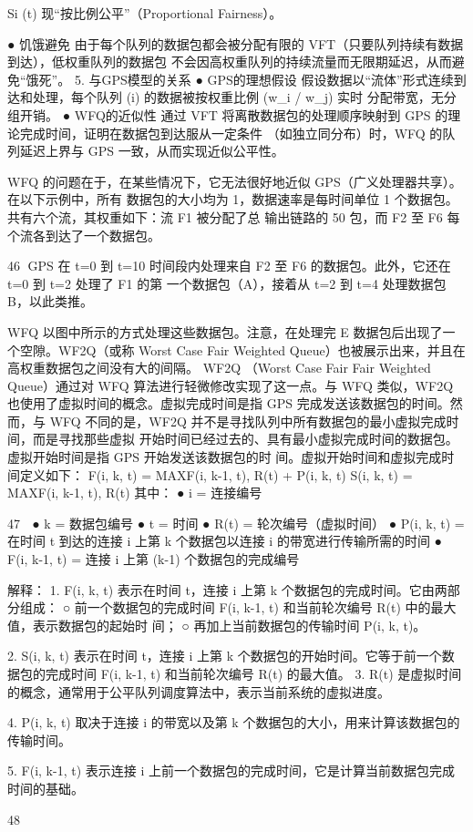           Si (t)
   现“按比例公平”（Proportional Fairness）。
                   ​




 ● 饥饿避免
   由于每个队列的数据包都会被分配有限的 VFT（只要队列持续有数据到达），低权重队列的数据包
   不会因高权重队列的持续流量而无限期延迟，从而避免“饿死”。
5. 与GPS模型的关系
 ● GPS的理想假设
   假设数据以“流体”形式连续到达和处理，每个队列 (i) 的数据被按权重比例 (w_i / \sum w_j) 实时
   分配带宽，无分组开销。
 ● WFQ的近似性
   通过 VFT 将离散数据包的处理顺序映射到 GPS 的理论完成时间，证明在数据包到达服从一定条件
   （如独立同分布）时，WFQ 的队列延迟上界与 GPS 一致，从而实现近似公平性。

WFQ 的问题在于，在某些情况下，它无法很好地近似 GPS（广义处理器共享）。在以下示例中，所有
数据包的大小均为 1，数据速率是每时间单位 1 个数据包。共有六个流，其权重如下：流 F1 被分配了总
输出链路的 50%
包，而 F2 至 F6 每个流各到达了一个数据包。




                                                           46
GPS 在 t=0 到 t=10 时间段内处理来自 F2 至 F6 的数据包。此外，它还在 t=0 到 t=2 处理了 F1 的第
一个数据包（A），接着从 t=2 到 t=4 处理数据包 B，以此类推。




WFQ 以图中所示的方式处理这些数据包。注意，在处理完 E 数据包后出现了一个空隙。WF2Q（或称
Worst Case Fair Weighted Queue）也被展示出来，并且在高权重数据包之间没有大的间隔。
WF2Q （Worst Case Fair Fair Weighted Queue）通过对 WFQ 算法进行轻微修改实现了这一点。与
WFQ 类似，WF2Q 也使用了虚拟时间的概念。虚拟完成时间是指 GPS 完成发送该数据包的时间。然
而，与 WFQ 不同的是，WF2Q 并不是寻找队列中所有数据包的最小虚拟完成时间，而是寻找那些虚拟
开始时间已经过去的、具有最小虚拟完成时间的数据包。虚拟开始时间是指 GPS 开始发送该数据包的时
间。虚拟开始时间和虚拟完成时间定义如下：
F(i, k, t) = MAX{F(i, k-1, t), R(t)} + P(i, k, t)
S(i, k, t) = MAX{F(i, k-1, t), R(t)}
其中：
  ● i = 连接编号


                                                                47
 ●  k = 数据包编号
 ● t = 时间
 ● R(t) = 轮次编号（虚拟时间）
 ● P(i, k, t) = 在时间 t 到达的连接 i 上第 k 个数据包以连接 i 的带宽进行传输所需的时间
 ● F(i, k-1, t) = 连接 i 上第 (k-1) 个数据包的完成编号

解释：
 1. F(i, k, t) 表示在时间 t，连接 i 上第 k 个数据包的完成时间。它由两部分组成：
      ○ 前一个数据包的完成时间 F(i, k-1, t) 和当前轮次编号 R(t) 中的最大值，表示数据包的起始时
         间；
      ○ 再加上当前数据包的传输时间 P(i, k, t)。

 2. S(i, k, t) 表示在时间 t，连接 i 上第 k 个数据包的开始时间。它等于前一个数据包的完成时间 F(i,
    k-1, t) 和当前轮次编号 R(t) 的最大值。
 3. R(t) 是虚拟时间的概念，通常用于公平队列调度算法中，表示当前系统的虚拟进度。

 4. P(i, k, t) 取决于连接 i 的带宽以及第 k 个数据包的大小，用来计算该数据包的传输时间。

 5. F(i, k-1, t) 表示连接 i 上前一个数据包的完成时间，它是计算当前数据包完成时间的基础。




                                                                 48
